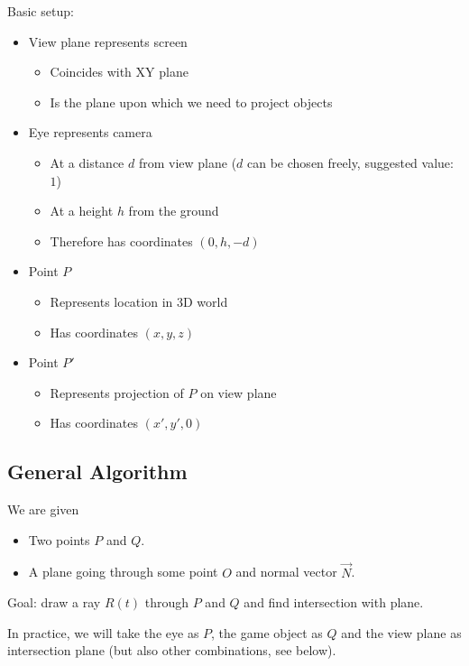 \documentclass[a4paper]{article}
\newcommand{\coords}[3]{\ensuremath{(#1,#2,#3)}}
\begin{document}
Basic setup:
\begin{itemize}
    \item View plane represents screen
          \begin{itemize}
            \item Coincides with XY plane
            \item Is the plane upon which we need to project objects
          \end{itemize}
    \item Eye represents camera
          \begin{itemize}
            \item At a distance $d$ from view plane ($d$ can be chosen freely, suggested value: $1$)
            \item At a height $h$ from the ground
            \item Therefore has coordinates $\coords{0}{h}{-d}$
          \end{itemize}
    \item Point $P$
          \begin{itemize}
            \item Represents location in 3D world
            \item Has coordinates $\coords{x}{y}{z}$
          \end{itemize}
    \item Point $P'$
          \begin{itemize}
            \item Represents projection of $P$ on view plane
            \item Has coordinates $\coords{x'}{y'}{0}$
          \end{itemize}
\end{itemize}

\subsection{General Algorithm}

We are given
\begin{itemize}
    \item Two points $P$ and $Q$.
    \item A plane going through some point $O$ and normal vector $\vec{N}$.
\end{itemize}

Goal: draw a ray $R(t)$ through $P$ and $Q$ and find intersection with plane.

In practice, we will take the eye as $P$, the game object as $Q$ and the view plane as intersection plane (but also other combinations, see below).
\end{document}
